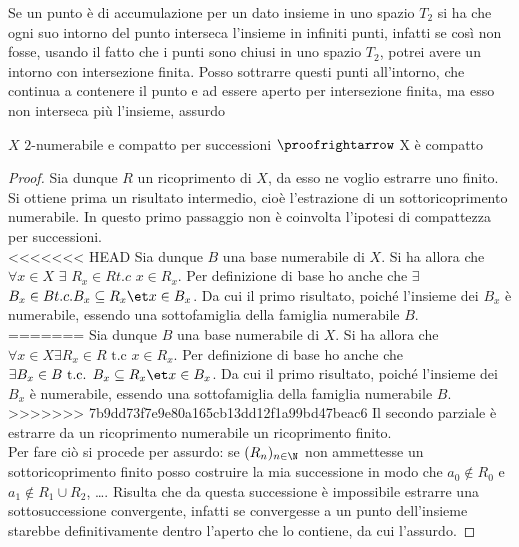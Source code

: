\begin{prop}
\begin{oss}
Se un punto è di accumulazione per un dato insieme in uno spazio $T_2$ si ha che ogni suo intorno del punto interseca l'insieme in infiniti punti, infatti se così non fosse, usando il fatto che i punti sono chiusi in uno spazio $T_2$, potrei avere un intorno con intersezione finita. Posso sottrarre questi punti all'intorno, che continua a contenere il punto e ad essere aperto per intersezione finita, ma esso non interseca più l'insieme, assurdo
\end{oss}

\begin{prop}
$X$ $2$-numerabile e compatto per successioni $\proofrightarrow$ X è compatto
\end{prop}
\begin{proof}
Sia dunque $R$ un ricoprimento di $X$, da esso ne voglio estrarre uno finito.\\
Si ottiene prima un risultato intermedio, cioè l'estrazione di un sottoricoprimento numerabile. In questo primo passaggio non è coinvolta l'ipotesi di compattezza per successioni.\\
<<<<<<< HEAD
Sia dunque $B$ una base numerabile di $X$. Si ha allora che $\forall x\in X$ $\exists$ $R_x \in R t.c$ $x\in R_x$. Per definizione di base ho anche che $\exists$ $B_x \in B t.c. B_x \subseteq R_x \et x\in B_x$. Da cui il primo risultato, poiché l'insieme dei $B_x$ è numerabile, essendo una sottofamiglia della famiglia numerabile $B$.\\
=======
Sia dunque $B$ una base numerabile di $X$. Si ha allora che $\forall x\in X \exists R_x \in R \text{ t.c } x\in R_x$. Per definizione di base ho anche che $\exists B_x \in B \text{ t.c. } B_x \subseteq R_x \et x\in B_x$. Da cui il primo risultato, poiché l'insieme dei $B_x$ è numerabile, essendo una sottofamiglia della famiglia numerabile $B$.\\
>>>>>>> 7b9dd73f7e9e80a165cb13dd12f1a99bd47beac6
Il secondo parziale è estrarre da un ricoprimento numerabile un ricoprimento finito.\\
Per fare ciò si procede per assurdo: se $(R_n)_{n\in \N}$ non ammettesse un sottoricoprimento finito posso costruire la mia successione in modo che $a_0 \not \in R_0$ e $a_1 \not \in R_1 \cup R_2$, \dots . Risulta che da questa successione è impossibile estrarre una sottosuccessione convergente, infatti se convergesse a un punto dell'insieme starebbe definitivamente dentro l'aperto che lo contiene, da cui l'assurdo.
\end{proof}


\end{prop}
